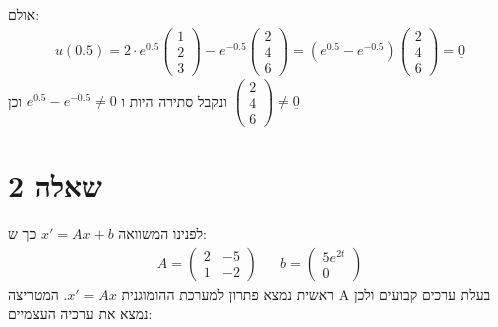 \documentclass{article}
\begin{document}
אולם:
\begin{align*}
    u(0.5)=2\cdot e^{0.5} \begin{pmatrix}
                              1 \\
                              2 \\
                              3
                          \end{pmatrix} - e^{-0.5}\begin{pmatrix}
                                                      2 \\
                                                      4 \\
                                                      6
                                                  \end{pmatrix}=
    (e^{0.5}-e^{-0.5})\begin{pmatrix}
                          2 \\
                          4 \\
                          6
                      \end{pmatrix}=\underline{0}
\end{align*}
ונקבל סתירה היות ו $e^{0.5}-e^{-0.5}\ne 0$ וכן $\begin{pmatrix}
        2 \\
        4 \\
        6
    \end{pmatrix}\ne \underline{0}$

\pagebreak

\section*{שאלה 2}

לפנינו המשוואה $x'=Ax+b$ כך ש:
\begin{align*}
    A=\begin{pmatrix}
          2 & -5 \\
          1 & -2
      \end{pmatrix} &  & b=\begin{pmatrix}
                               5e^{2t} \\
                               0
                           \end{pmatrix}
\end{align*}
ראשית נמצא פתרון למערכת ההומוגנית $x'=Ax$. המטריצה A בעלת ערכים קבועים ולכן נמצא את ערכיה העצמיים:


\pagebreak
\end{document}
